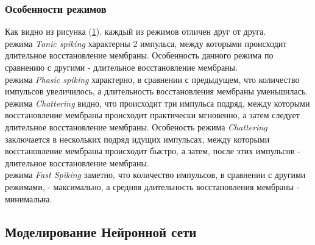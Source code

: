 \subsubsection{Особенности режимов}
\hspace*{\parindent}Как видно из рисунка (\hyperlink{res4}{1}), каждый из режимов отличен друг от друга.\\
 режима \textit{Tonic spiking} характерны 2 импульса, между которыми происходит длительное восстановление мембраны. Особенность данного режима по сравнению с другими - длительное восстановление мембраны.\\ 
 режима \textit{Phasic spiking} характерно, в сравнении с предыдущем, что количество импульсов увеличилось, а длительность восстановления мембраны уменьшилась.\\ 
 режима \textit{Chattering} видно, что происходит три импульса подряд, между которыми восстановление мембраны происходит практически мгновенно, а затем следует длительное восстановление мембраны. Особеность режима \textit{Chattering} заключается в нескольких подряд идущих импульсах, между которыми восстановление мембраны происходит быстро, а затем, после этих импульсов - длительное восстановление мембраны.\\  режима \textit{Fast Spiking} заметно, что количество импульсов, в сравнении с другими режимами, - максимально, а средняя длительность восстановления мембраны - минимальна.
\subsection{Моделирование Нейронной сети}
